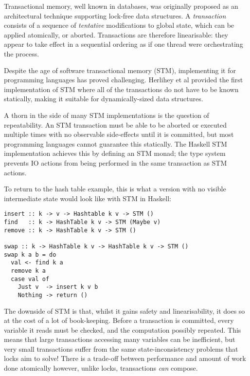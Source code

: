Transactional memory, well known in databases, was originally proposed
as an architectural technique supporting lock-free data
structures\cite{hardwaretm}. A \textit{transaction} consists of a
sequence of \textit{tentative} modifications to global state, which
can be applied atomically, or aborted. Transactions are therefore
linearisable: they appear to take effect in a sequential ordering as
if one thread were orchestrating the process.

Despite the age of software transactional memory (STM), implementing
it for programming languages has proved challenging. Herlihey et al
provided the first implementation of STM where all of the transactions
do not have to be known statically\cite{dstm}, making it suitable for
dynamically-sized data structures.

A thorn in the side of many STM implementations is the question of
repeatability. An STM transaction must be able to be aborted or
executed multiple times with no observable side-effects until it is
committed, but most programming languages cannot guarantee this
statically. The Haskell STM implementation\cite{haskellstm} achieves
this by defining an STM monad; the type system prevents IO actions
from being performed in the same transaction as STM actions.

To return to the hash table example, this is what a version with no
visible intermediate state would look like with STM in Haskell:

\begin{verbatim}
insert :: k -> v -> Hashtable k v -> STM ()
find   :: k -> HashTable k v -> STM (Maybe v)
remove :: k -> HashTable k v -> STM ()

swap :: k -> HashTable k v -> HashTable k v -> STM ()
swap k a b = do
  val <- find k a
  remove k a
  case val of
    Just v  -> insert k v b
    Nothing -> return ()
\end{verbatim}

The downside of STM is that, whilst it gains safety and
linearisability, it does so at the cost of a lot of
book-keeping. Before a transaction is committed, every variable it
reads must be checked, and the computation possibly repeated. This
means that large transactions accessing many variables can be
inefficient, but very small transactions suffer from the same
state-inconsistency problems that locks aim to solve! There is a
trade-off between performance and amount of work done atomically
however, unlike locks, transactions \textit{can} compose.

